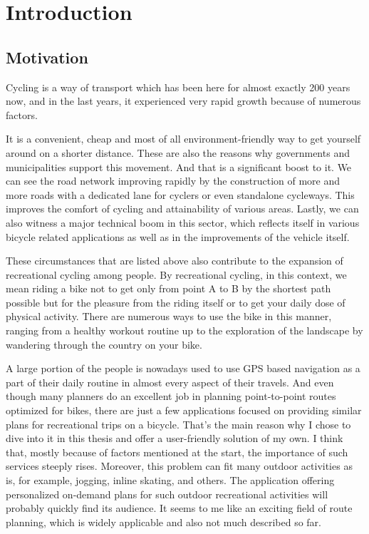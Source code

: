 \documentclass{ctuthesis}
\begin{document}
\maketitle
\chapter{Introduction}
\section{Motivation}
Cycling is a way of transport which has been here for almost exactly 200 years\cite{history} now, and in the last years, it experienced very rapid growth because of numerous factors. \par It is a convenient, cheap and most of all environment-friendly way to get yourself around on a shorter distance. These are also the reasons why governments and municipalities support this movement.\cite{uk}\cite{eu} And that is a significant boost to it. We can see the road network improving rapidly by the construction of more and more roads with a dedicated lane for cyclers or even standalone cycleways. This improves the comfort of cycling and attainability of various areas. Lastly, we can also witness a major technical boom in this sector, which reflects itself in various bicycle related applications as well as in the improvements of the vehicle itself. \par
These circumstances that are listed above also contribute to the expansion of recreational cycling among people. By recreational cycling, in this context, we mean riding a bike not to get only from point A to B by the shortest path possible but for the pleasure from the riding itself or to get your daily dose of physical activity. There are numerous ways to use the bike in this manner, ranging from a healthy workout routine up to the exploration of the landscape by wandering through the country on your bike. \par
A large portion of the people is nowadays used to use GPS based navigation as a part of their daily routine in almost every aspect of their travels. And even though many planners do an excellent job in planning point-to-point routes optimized for bikes, there are just a few applications focused on providing similar plans for recreational trips on a bicycle. That's the main reason why I chose to dive into it in this thesis and offer a user-friendly solution of my own. I think that, mostly because of factors mentioned at the start, the importance of such services steeply rises. Moreover, this problem can fit many outdoor activities as is, for example, jogging, inline skating, and others. The application offering personalized on-demand plans for such outdoor recreational activities will probably quickly find its audience. It seems to me like an exciting field of route planning, which is widely applicable and also not much described so far. \par
\end{document}
